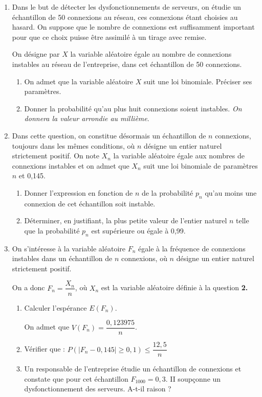 \begin{enumerate}
\item Dans le but de détecter les dysfonctionnements de serveurs, on étudie un échantillon de 50 connexions au réseau, ces connexions étant choisies au hasard. On suppose que le nombre de connexions est suffisamment important pour que ce choix puisse être assimilé à un tirage avec remise.

\smallskip

On désigne par $X$ la variable aléatoire égale au nombre de connexions instables au réseau de l'entreprise, dans cet échantillon de 50 connexions.

	\begin{enumerate}
		\item On admet que la variable aléatoire $X$ suit une loi binomiale. Préciser ses paramètres.
		\item Donner la probabilité qu'au plus huit connexions soient instables. \emph{On donnera la valeur arrondie au millième}.
	\end{enumerate}

\item Dans cette question, on constitue désormais un échantillon de $n$ connexions, toujours dans les mêmes conditions, où $n$ désigne un entier naturel strictement positif. On note $X_{n}$ la variable aléatoire égale aux nombres de connexions instables et on admet que $X_{n}$ suit une loi binomiale de paramètres $n$ et 0,145.
	\begin{enumerate}
		\item Donner l'expression en fonction de $n$ de la probabilité $p_{n}$ qu'au moins une connexion de cet échantillon soit instable.
		\item Déterminer, en justifiant, la plus petite valeur de l'entier naturel $n$ telle que la probabilité $p_{n}$ est supérieure ou égale à 0,99.
	\end{enumerate}
\item On s'intéresse à la variable aléatoire $F_{n}$ égale à la fréquence de connexions instables dans un échantillon de $n$ connexions, où $n$ désigne un entier naturel strictement positif.

On a donc $F_{n}=\dfrac{X_{n}}{n}$, où $X_{n}$ est la variable aléatoire définie à la question \textbf{2.}
	\begin{enumerate}
		\item Calculer l'espérance $E\left(F_{n}\right)$.

On admet que $V\left(F_{n}\right)=\dfrac{0,123975}{n}$.

		\item Vérifier que : $P\left(\left|F_{n}-0,145\right| \geqslant 0,1\right) \leqslant \dfrac{12,5}{n}$
		\item Un responsable de l'entreprise étudie un échantillon de  connexions et constate que pour cet échantillon $F_{1000}=0,3$. II soupçonne un dysfonctionnement des serveurs. A-t-il raison ?
	\end{enumerate}
\end{enumerate}
